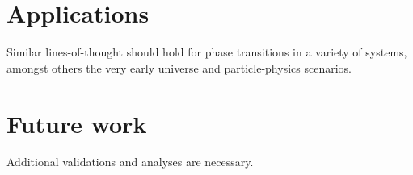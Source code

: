 

\section{Applications}
    Similar lines-of-thought should hold for phase transitions in a variety of systems, amongst others the very early universe and particle-physics scenarios. 




\section{Future work}
    Additional validations and analyses are necessary. 


